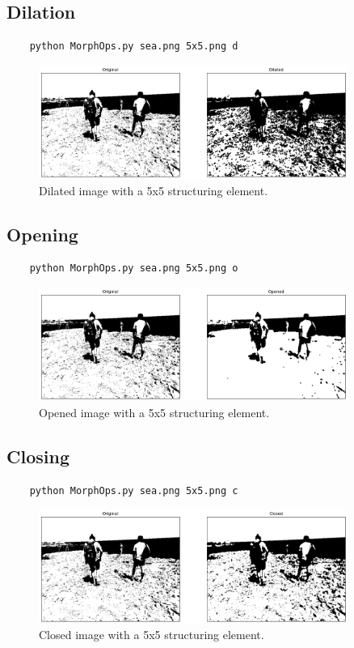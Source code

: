 \documentclass[12pt]{article}
\begin{document}
\subsection{Dilation}
\begin{verbatim}
    python MorphOps.py sea.png 5x5.png d
\end{verbatim}
\begin{figure}[h!]
    \centering
    \includegraphics[width=0.9\textwidth]{dilation.png}
    \caption{Dilated image with a 5x5 structuring element.}
\end{figure}

\subsection{Opening}
\begin{verbatim}
    python MorphOps.py sea.png 5x5.png o
\end{verbatim}
\begin{figure}[h!]
    \centering
    \includegraphics[width=0.9\textwidth]{opening.png}
    \caption{Opened image with a 5x5 structuring element.}
\end{figure}
\newpage
\subsection{Closing}
\begin{verbatim}
    python MorphOps.py sea.png 5x5.png c
\end{verbatim}
\begin{figure}[h!]
    \centering
    \includegraphics[width=0.9\textwidth]{closing.png}
    \caption{Closed image with a 5x5 structuring element.}
\end{figure}
\end{document}
